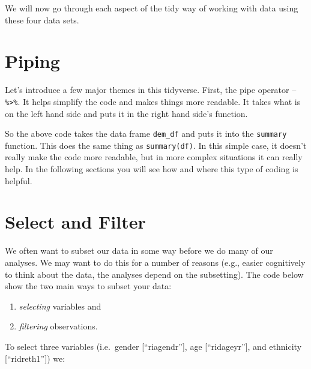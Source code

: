 \documentclass[]{tufte-book}
\newenvironment{Shaded}{}{}
\newcommand{\KeywordTok}[1]{\textcolor[rgb]{0.00,0.44,0.13}{\textbf{#1}}}
\newcommand{\StringTok}[1]{\textcolor[rgb]{0.25,0.44,0.63}{#1}}
\newcommand{\OperatorTok}[1]{\textcolor[rgb]{0.40,0.40,0.40}{#1}}
\newcommand{\NormalTok}[1]{#1}
\providecommand{\tightlist}{%
  \setlength{\itemsep}{0pt}\setlength{\parskip}{0pt}}
\theoremstyle{definition}
\theoremstyle{definition}
\theoremstyle{remark}
\begin{document}
We will now go through each aspect of the tidy way of working with data
using these four data sets.

\section*{Piping}\label{piping}

Let's introduce a few major themes in this tidyverse. First, the pipe
operator -- \texttt{\%\textgreater{}\%}. It helps simplify the code and
makes things more readable. It takes what is on the left hand side and
puts it in the right hand side's function.

\begin{Shaded}
\end{Shaded}

So the above code takes the data frame \texttt{dem\_df} and puts it into
the \texttt{summary} function. This does the same thing as
\texttt{summary(df)}. In this simple case, it doesn't really make the
code more readable, but in more complex situations it can really help.
In the following sections you will see how and where this type of coding
is helpful.

\section*{Select and Filter}\label{select-and-filter}

We often want to subset our data in some way before we do many of our
analyses. We may want to do this for a number of reasons (e.g., easier
cognitively to think about the data, the analyses depend on the
subsetting). The code below show the two main ways to subset your data:

\begin{enumerate}
\def\labelenumi{\arabic{enumi}.}
\tightlist
\item
  \emph{selecting} variables and
\item
  \emph{filtering} observations.
\end{enumerate}

To select three variables (i.e.~gender {[}``riagendr''{]}, age
{[}``ridageyr''{]}, and ethnicity {[}``ridreth1''{]}) we:

\begin{Shaded}
\end{Shaded}
\end{document}
